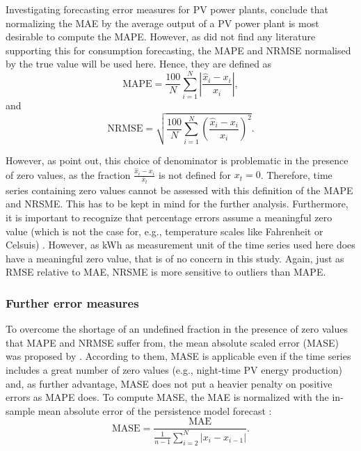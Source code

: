 Investigating forecasting error measures for PV power plants, \citet{Hoff:2013} conclude that normalizing the MAE by the average output of a PV power plant is most desirable to compute the MAPE. However, as \citet{Meer:2018} did not find any literature supporting this for consumption forecasting, the MAPE and NRMSE normalised by the true value will be used here. Hence, they are defined as
%
\begin{equation} \label{Eq:MAPE}
\text{MAPE}=\frac{100}{N}\sum_{i=1}^N\left|\frac{\widehat{x}_i-x_i}{x_i}\right|,
\end{equation}
and
\begin{equation} \label{Eq:NRMSE}
\text{NRMSE}=\sqrt{\frac{100}{N}\sum_{i=1}^N\left(\frac{\widehat{x}_i-x_i}{x_i}\right)^2}.
\end{equation}

\noindent However, as \citet{Hyndman:2006} point out, this choice of denominator is problematic in the presence of zero values, as the fraction $\frac{\widehat{x}_i-x_i}{\bar{x}_t}$ is not defined for $x_t=0$. Therefore, time series containing zero values cannot be assessed with this definition of the MAPE and NRSME. This has to be kept in mind for the further analysis. Furthermore, it is important to recognize that percentage errors assume a meaningful zero value (which is not the case for, e.g., temperature scales like Fahrenheit or Celsuis) \citep{Hyndman:2006}. However, as kWh as measurement unit of the time series used here does have a meaningful zero value, that is of no concern in this study. Again, just as RMSE relative to MAE, NRSME is more sensitive to outliers than MAPE.


\subsubsection{Further error measures}

To overcome the shortage of an undefined fraction in the presence of zero values that MAPE and NRMSE suffer from, the mean absolute scaled error (MASE) was proposed by \citet{Hyndman:2006}. According to them, MASE is applicable even if the time series includes a great number of zero values (e.g., night-time PV energy production) and, as further advantage, MASE does not put a heavier penalty on positive errors as MAPE does. To compute MASE, the MAE is normalized with the in-sample mean absolute error of the persistence model forecast \citet{Hyndman:2006}:
%
\begin{equation} \label{Eq:MASE}
\text{MASE}=\frac{\text{MAE}}{\frac{1}{n-1}\sum_{i=2}^N\left|x_i-x_{i-1}\right|}.
\end{equation}

